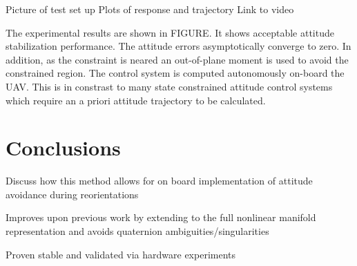 \documentclass[letterpaper, 10 pt, conference]{ieeeconf}  %
\begin{document}
Picture of test set up
Plots of response and trajectory
Link to video

The experimental results are shown in FIGURE.
It shows acceptable attitude stabilization performance.
The attitude errors asymptotically converge to zero. 
In addition, as the constraint is neared an out-of-plane moment is used to avoid the constrained region.
The control system is computed autonomously on-board the UAV.
This is in constrast to many state constrained attitude control systems which require an a priori attitude trajectory to be calculated. 
\section{Conclusions}

Discuss how this method allows for on board implementation of attitude avoidance during reorientations

Improves upon previous work by extending to the full nonlinear manifold representation and avoids quaternion ambiguities/singularities

Proven stable and validated via hardware experiments



\appendix



\addtolength{\textheight}{-12cm}   %
                                  


\end{document}
